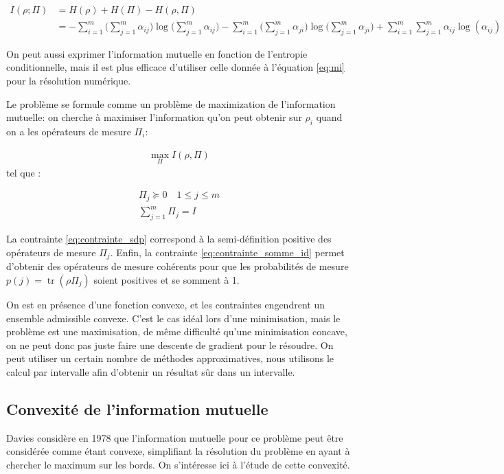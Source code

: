 \documentclass[12pt,a4paper]{article}
\DeclareMathOperator{\tr}{tr}
\begin{document}
    \begin{align}
        \label{eq:mi}
        I(\rho; \Pi) &= H(\rho) + H(\Pi) - H(\rho, \Pi) \nonumber \\
        &= - \displaystyle \sum_{i=1}^{m} \big(\displaystyle \sum_{j=1}^{m} \alpha_{ij} \big) \log \big( \displaystyle \sum_{j=1}^{m} \alpha_{ij} \big) - \displaystyle \sum_{i=1}^{m} \big(\displaystyle \sum_{j=1}^{m} \alpha_{ji} \big) \log \big( \displaystyle \sum_{j=1}^{m} \alpha_{ji}\big) + \displaystyle \sum_{i=1}^{m} \displaystyle \sum_{j=1}^{m} \alpha_{ij} \log( \alpha_{ij} )
    \end{align}

    On peut aussi exprimer l'information mutuelle en fonction de l'entropie conditionnelle, mais il est plus efficace d'utiliser celle donnée à l'équation \ref{eq:mi} pour la résolution numérique.

    Le problème se formule comme un problème de maximization de l'information mutuelle: on cherche à maximiser l'information qu'on peut obtenir sur $\rho_i$ quand on a les opérateurs de mesure $\Pi_i$:

    \begin{align}
        \max\limits_{\Pi} I(\rho, \Pi)
    \end{align}
    tel que :

    \begin{align}
        \Pi_j \succeq 0 \quad 1 \leq j \leq m \label{eq:contrainte_sdp} \\
        \displaystyle \sum_{j=1}^{m} \Pi_j = I \label{eq:contrainte_somme_id}
    \end{align}

    La contrainte \ref{eq:contrainte_sdp} correspond à la semi-définition positive des opérateurs de mesure $\Pi_j$. Enfin, la contrainte \ref{eq:contrainte_somme_id} permet d'obtenir des opérateurs de mesure cohérents pour que les probabilités de mesure $p(j) = \tr (\rho \Pi_j)$ soient positives et se somment à 1.

    On est en présence d'une fonction convexe, et les contraintes engendrent un ensemble admissible convexe. C'est le cas idéal lors d'une minimisation, mais le problème est une maximisation, de même difficulté qu'une minimisation concave, on ne peut donc pas juste faire une descente de gradient pour le résoudre. On peut utiliser un certain nombre de méthodes approximatives, nous utilisons le calcul par intervalle afin d'obtenir un résultat sûr dans un intervalle.

    \subsection*{Convexité de l'information mutuelle}
    Davies considère en 1978 que l'information mutuelle pour ce problème peut être considérée comme étant convexe, simplifiant la résolution du problème en ayant à chercher le maximum sur les bords. On s'intéresse ici à l'étude de cette convexité.
    
\end{document}
